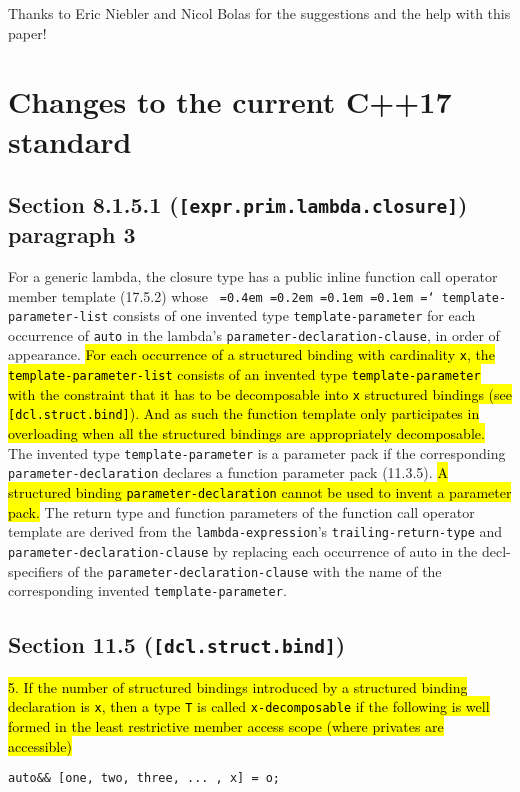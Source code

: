 \documentclass{article}
\DeclareRobustCommand{\hlgreen}[1]{{\sethlcolor{green}\hl{#1}}}
\newcommand*\justify{%
  \fontdimen2\font=0.4em%
  \fontdimen3\font=0.2em%
  \fontdimen4\font=0.1em%
  \fontdimen7\font=0.1em%
  \hyphenchar\font=`\-%
}
\begin{document}
Thanks to Eric Niebler and Nicol Bolas for the suggestions and the help with
this paper!


\section{Changes to the current C++17 standard}
\subsection{Section 8.1.5.1 (\texttt{[expr.prim.lambda.closure]}) paragraph 3}

For a generic lambda, the closure type has a public inline function call
operator member template (17.5.2) whose \texttt{\justify template-parameter-list}
consists of one invented type \texttt{template-parameter} for each occurrence
of \texttt{auto} in the lambda’s \texttt{parameter-declaration-clause}, in
order of appearance.  \hlgreen{For each occurrence of a structured binding with
cardinality \texttt{x}, the \texttt{template-parameter-list} consists of an
invented type \texttt{template-parameter} with the constraint that it has to
be decomposable into \texttt{x} structured bindings (see
\texttt{[dcl.struct.bind]}).  And as such the function template only
participates in overloading when all the structured bindings are appropriately
decomposable.} The invented type \texttt{template-parameter} is a parameter
pack if the corresponding \texttt{parameter-declaration} declares a function
parameter pack (11.3.5).  \hlgreen{A structured binding
\texttt{parameter-declaration} cannot be used to invent a parameter pack.} The
return type and function parameters of the function call operator template are
derived from the \texttt{lambda-expression}’s \texttt{trailing-return-type}
and \texttt{parameter-declaration-clause} by replacing each occurrence of auto
in the decl-specifiers of the \texttt{parameter-declaration-clause} with the
name of the corresponding invented \texttt{template-parameter}.


\subsection{Section 11.5 (\texttt{[dcl.struct.bind]})}

\hlgreen{5.  If the number of structured bindings introduced by a structured
binding declaration is \texttt{x}, then a type \texttt{T} is called
\texttt{x-decomposable} if the following is well formed in the least
restrictive member access scope (where privates are accessible)}
\begin{lstlisting}
auto&& [one, two, three, ... , x] = o;
\end{lstlisting}
\end{document}
